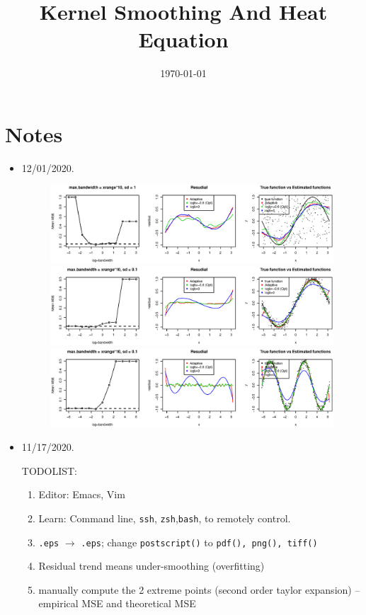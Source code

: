 \documentclass{article}
\title{Kernel Smoothing And Heat Equation}
\date{\today}
\begin{document}
\maketitle

\section{Notes}
\label{sec:notes}

\begin{itemize}
\item 12/01/2020. 
\begin{figure}[H]
\includegraphics[width=\linewidth]{pic/sim.plot1.eps}
\includegraphics[width=\linewidth]{pic/sim.plot2.eps}
\includegraphics[width=\linewidth]{pic/sim.plot3.eps}
\end{figure}



\item 11/17/2020. 

TODOLIST:
\begin{enumerate}
\item Editor: Emacs, Vim
\item Learn: Command line, \texttt{ssh}, \texttt{zsh},\texttt{bash}, to remotely control.
\item \texttt{.eps} $\rightarrow$ \texttt{.eps}; change \texttt{postscript()} to \texttt{pdf(), png(), tiff()}
\item Residual trend means under-smoothing (overfitting)
\item manually compute the 2 extreme points (second order taylor expansion) -- empirical MSE and theoretical MSE
\end{enumerate}


\end{itemize}
\end{document}
